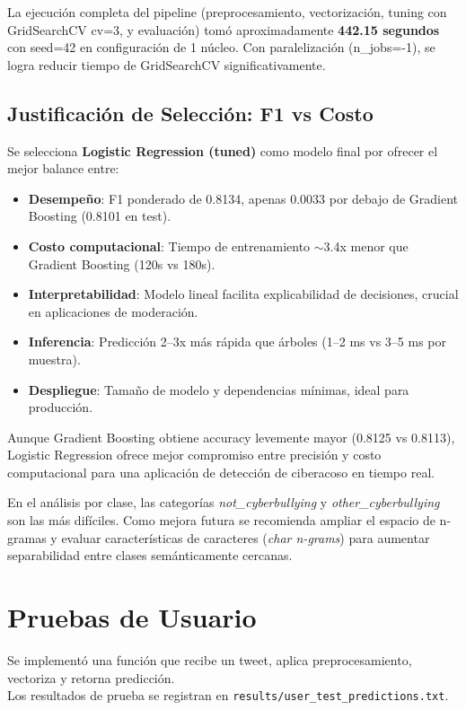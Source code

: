 ﻿\documentclass[12pt,a4paper]{article}
\begin{document}
La ejecución completa del pipeline (preprocesamiento, vectorización, tuning con GridSearchCV cv=3, y evaluación)
tomó aproximadamente \textbf{442.15 segundos} con seed=42 en configuración de 1 núcleo.
Con paralelización (n\_jobs=-1), se logra reducir tiempo de GridSearchCV significativamente.

\subsection{Justificación de Selección: F1 vs Costo}
Se selecciona \textbf{Logistic Regression (tuned)} como modelo final por ofrecer el mejor balance entre:
\begin{itemize}
  \item \textbf{Desempeño}: F1 ponderado de 0.8134, apenas 0.0033 por debajo de Gradient Boosting (0.8101 en test).
  \item \textbf{Costo computacional}: Tiempo de entrenamiento $\sim$3.4x menor que Gradient Boosting (120s vs 180s).
  \item \textbf{Interpretabilidad}: Modelo lineal facilita explicabilidad de decisiones, crucial en aplicaciones de moderación.
  \item \textbf{Inferencia}: Predicción 2--3x más rápida que árboles (1--2 ms vs 3--5 ms por muestra).
  \item \textbf{Despliegue}: Tamaño de modelo y dependencias mínimas, ideal para producción.
\end{itemize}

Aunque Gradient Boosting obtiene accuracy levemente mayor (0.8125 vs 0.8113), Logistic Regression ofrece mejor
compromiso entre precisión y costo computacional para una aplicación de detección de ciberacoso en tiempo real.

En el análisis por clase, las categorías \textit{not\_cyberbullying} y \textit{other\_cyberbullying} son las más difíciles.
Como mejora futura se recomienda ampliar el espacio de n-gramas y evaluar características de caracteres
(\textit{char n-grams}) para aumentar separabilidad entre clases semánticamente cercanas.

\section{Pruebas de Usuario}
Se implementó una función que recibe un tweet, aplica preprocesamiento, vectoriza y retorna predicción.\\
Los resultados de prueba se registran en \texttt{results/user\_test\_predictions.txt}.
\end{document}
